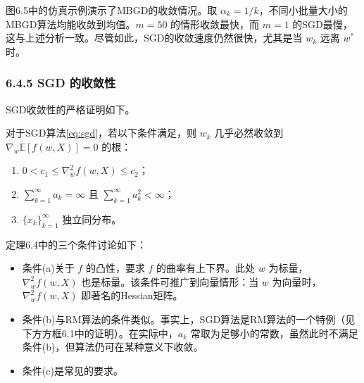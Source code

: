 \documentclass[UTF8]{article}
\begin{document}
图6.5中的仿真示例演示了MBGD的收敛情况。取 $\alpha_k = 1/k$，不同小批量大小的MBGD算法均能收敛到均值。$m = 50$ 的情形收敛最快，而 $m = 1$ 的SGD最慢，这与上述分析一致。尽管如此，SGD的收敛速度仍然很快，尤其是当 $w_k$ 远离 $w^*$ 时。

\subsubsection*{6.4.5 SGD 的收敛性}

SGD收敛性的严格证明如下。

\begin{theorembox}
    对于SGD算法\eqref{eq:sgd}，若以下条件满足，则 $w_k$ 几乎必然收敛到 $\nabla_w \mathbb{E}[f(w, X)] = 0$ 的根：
    \begin{enumerate}
        \item $0 < c_1 \leq \nabla_w^2 f(w, X) \leq c_2$；
        \item $\displaystyle\sum_{k=1}^{\infty} a_k = \infty$ 且 $\displaystyle\sum_{k=1}^{\infty} a_k^2 < \infty$；
        \item $\{x_k\}_{k=1}^{\infty}$ 独立同分布。
    \end{enumerate}
\end{theorembox}

定理6.4中的三个条件讨论如下：
\begin{itemize}
    \item 条件(a)关于 $f$ 的凸性，要求 $f$ 的曲率有上下界。此处 $w$ 为标量，$\nabla_w^2 f(w, X)$ 也是标量。该条件可推广到向量情形：当 $w$ 为向量时，$\nabla_w^2 f(w, X)$ 即著名的Hessian矩阵。
    \item 条件(b)与RM算法的条件类似。事实上，SGD算法是RM算法的一个特例（见下方方框6.1中的证明）。在实际中，$a_k$ 常取为足够小的常数，虽然此时不满足条件(b)，但算法仍可在某种意义下收敛。
    \item 条件(c)是常见的要求。
\end{itemize}
\end{document}
